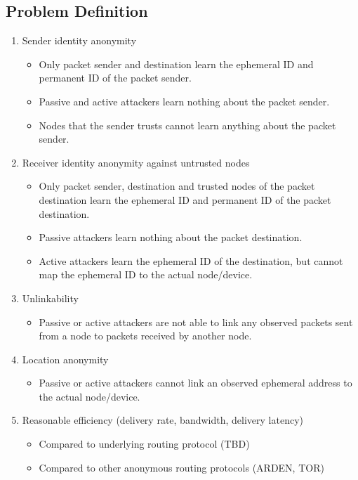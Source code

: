 \documentclass[11pt]{article}
\begin{document}
\subsection{Problem Definition}
\label{problem}
\begin{enumerate}
\item Sender identity anonymity
  \begin{itemize}
  \item Only packet sender and destination learn the ephemeral ID and permanent ID of the packet sender. 
  \item Passive and active attackers learn nothing about the packet sender.
  \item Nodes that the sender trusts cannot learn anything about the packet sender. 
  \end{itemize}

\item Receiver identity anonymity against untrusted nodes
  \begin{itemize}
  \item Only packet sender, destination and trusted nodes of the packet destination learn the ephemeral ID and permanent ID of the packet destination. 
  \item Passive attackers learn nothing about the packet destination.
  \item Active attackers learn the ephemeral ID of the destination, but cannot map the ephemeral ID to the actual node/device.
  \end{itemize}

\item Unlinkability
  \begin{itemize}
  \item Passive or active attackers are not able to link any observed packets sent from a node to packets received by another node.   
  \end{itemize}

\item Location anonymity 
  \begin{itemize}
  \item Passive or active attackers cannot link an observed ephemeral address to the actual node/device.
  \end{itemize}

\item Reasonable efficiency (delivery rate, bandwidth, delivery latency)
	\begin{itemize}
	\item Compared to underlying routing protocol (TBD)
	\item Compared to other anonymous routing protocols (ARDEN, TOR)
	\end{itemize}

\end{enumerate}
\end{document}
